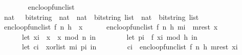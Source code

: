 \begin{isabellebody}
\ \ \ \ \ \ \ \ {\isacharparenright}{\kern0pt}{\isachardoublequoteclose}\isanewline
\isanewline
\isanewline
\isanewline
\isanewline
{}\isamarkupfalse%
\ enc{\isacharunderscore}{\kern0pt}loop{\isacharunderscore}{\kern0pt}func{\isacharunderscore}{\kern0pt}list\ \isanewline
\ \ {\isacharcolon}{\kern0pt}{\isacharcolon}{\kern0pt}\ {\isachardoublequoteopen}{\isacharparenleft}{\kern0pt}{\isacharparenleft}{\kern0pt}nat\ \ {\isacharequal}{\kern0pt}{\isachargreater}{\kern0pt}\ bitstring{\isacharparenright}{\kern0pt}\ {\isasymtimes}\ nat\ {\isasymtimes}\ nat\ {\isasymtimes}\ bitstring\ list{\isacharparenright}{\kern0pt}\ {\isasymRightarrow}\ nat\ {\isasymRightarrow}\ bitstring\ list{\isachardoublequoteclose}\ \isanewline
\ \ \isanewline
\ \ \ {\isachardoublequoteopen}enc{\isacharunderscore}{\kern0pt}loop{\isacharunderscore}{\kern0pt}func{\isacharunderscore}{\kern0pt}list\ {\isacharparenleft}{\kern0pt}f{\isacharcomma}{\kern0pt}\ n{\isacharcomma}{\kern0pt}\ h{\isacharcomma}{\kern0pt}\ {\isacharbrackleft}{\kern0pt}{\isacharbrackright}{\kern0pt}{\isacharparenright}{\kern0pt}\ x\ {\isacharequal}{\kern0pt}\ {\isacharbrackleft}{\kern0pt}{\isacharbrackright}{\kern0pt}{\isachardoublequoteclose}\ {\isacharbar}{\kern0pt}\isanewline
\ \ \ {\isachardoublequoteopen}enc{\isacharunderscore}{\kern0pt}loop{\isacharunderscore}{\kern0pt}func{\isacharunderscore}{\kern0pt}list\ {\isacharparenleft}{\kern0pt}f{\isacharcomma}{\kern0pt}\ n{\isacharcomma}{\kern0pt}\ h{\isacharcomma}{\kern0pt}\ {\isacharparenleft}{\kern0pt}m{\isacharunderscore}{\kern0pt}i\ {\isacharhash}{\kern0pt}\ m{\isacharunderscore}{\kern0pt}rest{\isacharparenright}{\kern0pt}{\isacharparenright}{\kern0pt}\ x\ {\isacharequal}{\kern0pt}\isanewline
\ \ \ \ \ \ \ \ {\isacharparenleft}{\kern0pt}let\ x{\isacharunderscore}{\kern0pt}i\ {\isacharequal}{\kern0pt}\ x\ {\isacharasterisk}{\kern0pt}\ x\ mod\ n\ in\isanewline
\ \ \ \ \ \ \ \ let\ p{\isacharunderscore}{\kern0pt}i\ {\isacharequal}{\kern0pt}\ f\ {\isacharparenleft}{\kern0pt}x{\isacharunderscore}{\kern0pt}i\ mod\ {}{\isacharcircum}{\kern0pt}h{\isacharparenright}{\kern0pt}\ in\isanewline
\ \ \ \ \ \ \ \ let\ c{\isacharunderscore}{\kern0pt}i\ {\isacharequal}{\kern0pt}\ xor{\isacharunderscore}{\kern0pt}list\ m{\isacharunderscore}{\kern0pt}i\ p{\isacharunderscore}{\kern0pt}i\ in\isanewline
\ \ \ \ \ \ \ \ c{\isacharunderscore}{\kern0pt}i\ {\isacharhash}{\kern0pt}\ enc{\isacharunderscore}{\kern0pt}loop{\isacharunderscore}{\kern0pt}func{\isacharunderscore}{\kern0pt}list\ {\isacharparenleft}{\kern0pt}f{\isacharcomma}{\kern0pt}\ n{\isacharcomma}{\kern0pt}\ h{\isacharcomma}{\kern0pt}\ m{\isacharunderscore}{\kern0pt}rest{\isacharparenright}{\kern0pt}\ x{\isacharunderscore}{\kern0pt}i\isanewline

\end{isabellebody}
